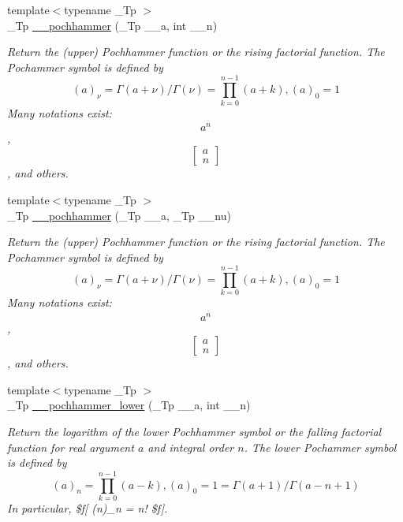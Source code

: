\begin{DoxyCompactItemize}
{\footnotesize template$<$typename \+\_\+\+Tp $>$ }\\\+\_\+\+Tp \hyperlink{namespacestd_1_1____detail_aca07ee173947de27d63b2e2759a1b0c5}{\+\_\+\+\_\+pochhammer} (\+\_\+\+Tp \+\_\+\+\_\+a, int \+\_\+\+\_\+n)
\begin{DoxyCompactList}\small\item\em Return the (upper) Pochhammer function or the rising factorial function. The Pochammer symbol is defined by \[ (a)_\nu = \Gamma(a + \nu) / \Gamma(\nu) = \prod_{k=0}^{n-1} (a + k), (a)_0 = 1 \] Many notations exist\+: \[ a^{\overline{n}} \], \[ \left[ \begin{array}{c} a \\ n \end{array} \right] \], and others. \end{DoxyCompactList}\item 
{\footnotesize template$<$typename \+\_\+\+Tp $>$ }\\\+\_\+\+Tp \hyperlink{namespacestd_1_1____detail_aa844ee309d6d977631302cb6cd7c4bdf}{\+\_\+\+\_\+pochhammer} (\+\_\+\+Tp \+\_\+\+\_\+a, \+\_\+\+Tp \+\_\+\+\_\+nu)
\begin{DoxyCompactList}\small\item\em Return the (upper) Pochhammer function or the rising factorial function. The Pochammer symbol is defined by \[ (a)_\nu = \Gamma(a + \nu) / \Gamma(\nu) = \prod_{k=0}^{n-1} (a + k), (a)_0 = 1 \] Many notations exist\+: \[ a^{\overline{n}} \], \[ \left[ \begin{array}{c} a \\ n \end{array} \right] \], and others. \end{DoxyCompactList}\item 
{\footnotesize template$<$typename \+\_\+\+Tp $>$ }\\\+\_\+\+Tp \hyperlink{namespacestd_1_1____detail_a9660424661fca12b84325ad3c70fe1e1}{\+\_\+\+\_\+pochhammer\+\_\+lower} (\+\_\+\+Tp \+\_\+\+\_\+a, int \+\_\+\+\_\+n)
\begin{DoxyCompactList}\small\item\em Return the logarithm of the lower Pochhammer symbol or the falling factorial function for real argument $ a $ and integral order $ n $. The lower Pochammer symbol is defined by \[ (a)_n = \prod_{k=0}^{n-1} (a - k), (a)_0 = 1 = \Gamma(a + 1) / \Gamma(a - n + 1) \] In particular, \$f\mbox{[} (n)\+\_\+n = n! \$f\mbox{]}. \end{DoxyCompactList}\item 

\end{DoxyCompactItemize}
